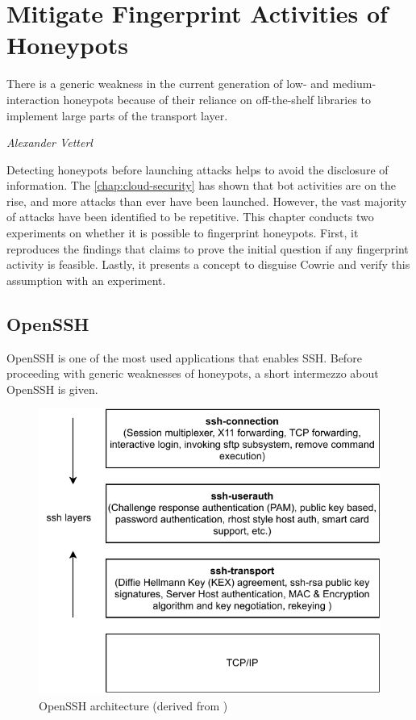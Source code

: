 \chapter{Mitigate Fingerprint Activities of Honeypots}
\label{chap:fingerprinting}

\epigraph{There is a generic weakness in the current generation of low- and medium-interaction honeypots because of their reliance on off-the-shelf libraries to implement large parts of the transport layer.}{\textit{Alexander Vetterl}}

Detecting honeypots before launching attacks helps to avoid the disclosure of information.
The \autoref{chap:cloud-security} has shown that bot activities are on the rise, and more attacks than ever have been launched.
However, the vast majority of attacks have been identified to be repetitive.
This chapter conducts two experiments on whether it is possible to fingerprint honeypots.
First, it reproduces the findings that \citet{vetterl2020} claims to prove the initial question if any fingerprint activity is feasible.
Lastly, it presents a concept to disguise Cowrie and verify this assumption with an experiment.

\section{OpenSSH}
\label{sec:openssh}

OpenSSH is one of the most used applications that enables SSH.
Before proceeding with generic weaknesses of honeypots, a short intermezzo about OpenSSH is given.

\begin{figure}
    \centering
    \includegraphics{figures/openssh-architecture.pdf}
    \caption[OpenSSH architecture]{
        OpenSSH architecture (derived from \cite{openssh2007})
    }
    \label{fig:openssh-architecture}
\end{figure}

